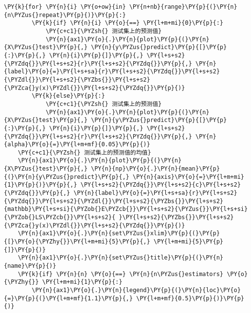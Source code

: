 \begin{Verbatim}[commandchars=\\\{\}]
    \PY{k}{for} \PY{n}{i} \PY{o+ow}{in} \PY{n+nb}{range}\PY{p}{(}\PY{n}{n\PYZus{}repeat}\PY{p}{)}\PY{p}{:}
        \PY{k}{if} \PY{n}{i} \PY{o}{==} \PY{l+m+mi}{0}\PY{p}{:}
            \PY{c+c1}{\PYZsh{} 测试集上的预测值}
            \PY{n}{ax1}\PY{o}{.}\PY{n}{plot}\PY{p}{(}\PY{n}{X\PYZus{}test}\PY{p}{,} \PY{n}{y\PYZus{}predict}\PY{p}{[}\PY{p}{:}\PY{p}{,} \PY{n}{i}\PY{p}{]}\PY{p}{,} \PY{l+s+s2}{\PYZdq{}}\PY{l+s+s2}{r}\PY{l+s+s2}{\PYZdq{}}\PY{p}{,} \PY{n}{label}\PY{o}{=}\PY{l+s+sa}{r}\PY{l+s+s2}{\PYZdq{}}\PY{l+s+s2}{\PYZdl{}}\PY{l+s+s2}{\PYZbs{}}\PY{l+s+s2}{\PYZca{}y(x)\PYZdl{}}\PY{l+s+s2}{\PYZdq{}}\PY{p}{)}
        \PY{k}{else}\PY{p}{:}
            \PY{c+c1}{\PYZsh{} 测试集上的预测值}
            \PY{n}{ax1}\PY{o}{.}\PY{n}{plot}\PY{p}{(}\PY{n}{X\PYZus{}test}\PY{p}{,} \PY{n}{y\PYZus{}predict}\PY{p}{[}\PY{p}{:}\PY{p}{,} \PY{n}{i}\PY{p}{]}\PY{p}{,} \PY{l+s+s2}{\PYZdq{}}\PY{l+s+s2}{r}\PY{l+s+s2}{\PYZdq{}}\PY{p}{,} \PY{n}{alpha}\PY{o}{=}\PY{l+m+mf}{0.05}\PY{p}{)}
    \PY{c+c1}{\PYZsh{} 测试集上的预测值的均值}
    \PY{n}{ax1}\PY{o}{.}\PY{n}{plot}\PY{p}{(}\PY{n}{X\PYZus{}test}\PY{p}{,} \PY{n}{np}\PY{o}{.}\PY{n}{mean}\PY{p}{(}\PY{n}{y\PYZus{}predict}\PY{p}{,} \PY{n}{axis}\PY{o}{=}\PY{l+m+mi}{1}\PY{p}{)}\PY{p}{,} \PY{l+s+s2}{\PYZdq{}}\PY{l+s+s2}{c}\PY{l+s+s2}{\PYZdq{}}\PY{p}{,} \PY{n}{label}\PY{o}{=}\PY{l+s+sa}{r}\PY{l+s+s2}{\PYZdq{}}\PY{l+s+s2}{\PYZdl{}}\PY{l+s+s2}{\PYZbs{}}\PY{l+s+s2}{mathbb}\PY{l+s+si}{\PYZob{}E\PYZcb{}}\PY{l+s+s2}{\PYZus{}}\PY{l+s+si}{\PYZob{}LS\PYZcb{}}\PY{l+s+s2}{ }\PY{l+s+s2}{\PYZbs{}}\PY{l+s+s2}{\PYZca{}y(x)\PYZdl{}}\PY{l+s+s2}{\PYZdq{}}\PY{p}{)}
    \PY{n}{ax1}\PY{o}{.}\PY{n}{set\PYZus{}xlim}\PY{p}{(}\PY{p}{[}\PY{o}{\PYZhy{}}\PY{l+m+mi}{5}\PY{p}{,} \PY{l+m+mi}{5}\PY{p}{]}\PY{p}{)}
    \PY{n}{ax1}\PY{o}{.}\PY{n}{set\PYZus{}title}\PY{p}{(}\PY{n}{name}\PY{p}{)}
    \PY{k}{if} \PY{n}{n} \PY{o}{==} \PY{n}{n\PYZus{}estimators} \PY{o}{\PYZhy{}} \PY{l+m+mi}{1}\PY{p}{:}
        \PY{n}{ax1}\PY{o}{.}\PY{n}{legend}\PY{p}{(}\PY{n}{loc}\PY{o}{=}\PY{p}{(}\PY{l+m+mf}{1.1}\PY{p}{,} \PY{l+m+mf}{0.5}\PY{p}{)}\PY{p}{)}


\end{Verbatim}

